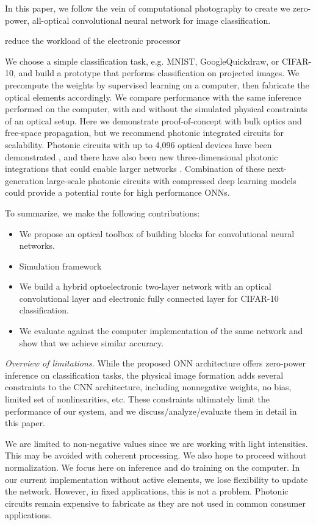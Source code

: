In this paper, we follow the vein of computational photography to create we zero-power, all-optical convolutional neural network for image classification. 

reduce the workload of the electronic processor


We choose a simple classification task, e.g. MNIST, GoogleQuickdraw, or CIFAR-10, and build a prototype that performs classification on projected images. We precompute the weights by supervised learning on a computer, then fabricate the optical elements accordingly. We compare performance with the same inference performed on the computer, with and without the simulated physical constraints of an optical setup. Here we demonstrate proof-of-concept with bulk optics and free-space propagation, but we recommend photonic integrated circuits for scalability. Photonic circuits with up to 4,096 optical devices have been demonstrated \cite{sun2013large}, and there have also been new three-dimensional photonic integrations that could enable larger networks \cite{rechtsman2013photonic}. Combination of these next-generation large-scale photonic circuits with compressed deep learning models could provide a potential route for high performance ONNs.

To summarize, we make the following contributions:
\begin{itemize}
\item We propose an optical toolbox of building blocks for convolutional neural networks. 
\item Simulation framework
\item We build a hybrid optoelectronic two-layer network with an optical convolutional layer and electronic fully connected layer for CIFAR-10 classification. 
\item We evaluate against the computer implementation of the same network and show that we achieve similar accuracy.
\end{itemize}

\textit{Overview of limitations.} 
While the proposed ONN architecture offers zero-power inference on classification tasks, the physical image formation adds several constraints to the CNN architecture, including nonnegative weights, no bias, limited set of nonlinearities, etc. These constraints ultimately limit the performance of our system, and we discuss/analyze/evaluate them in detail in this paper.

We are limited to non-negative values since we are working with light intensities. This may be avoided with coherent processing. We also hope to proceed without normalization. We focus here on inference and do training on the computer. In our current implementation without active elements, we lose flexibility to update the network. However, in fixed applications, this is not a problem. Photonic circuits remain expensive to fabricate as they are not used in common consumer applications.
